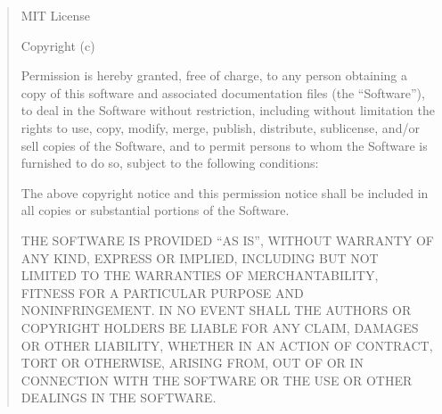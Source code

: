 %

\makeatletter

\expandafter\def\csname qdissertation@licensetext@MIT\endcsname{%
  \begin{quote}\small\raggedright
    MIT License

    Copyright (c) \ifstrempty{\qdissertation@licenseyear}{\number\year}{\qdissertation@licenseyear}\ %
    \ifstrempty{\qdissertation@copyrightholder}{\qdissertation@author}{\qdissertation@copyrightholder}

    Permission is hereby granted, free of charge, to any person obtaining a copy of this software and associated documentation files (the ``Software''), to deal in the Software without restriction, including without limitation the rights to use, copy, modify, merge, publish, distribute, sublicense, and/or sell copies of the Software, and to permit persons to whom the Software is furnished to do so, subject to the following conditions:

    The above copyright notice and this permission notice shall be included in all copies or substantial portions of the Software.

    THE SOFTWARE IS PROVIDED ``AS IS'', WITHOUT WARRANTY OF ANY KIND, EXPRESS OR IMPLIED, INCLUDING BUT NOT LIMITED TO THE WARRANTIES OF MERCHANTABILITY, FITNESS FOR A PARTICULAR PURPOSE AND NONINFRINGEMENT. IN NO EVENT SHALL THE AUTHORS OR COPYRIGHT HOLDERS BE LIABLE FOR ANY CLAIM, DAMAGES OR OTHER LIABILITY, WHETHER IN AN ACTION OF CONTRACT, TORT OR OTHERWISE, ARISING FROM, OUT OF OR IN CONNECTION WITH THE SOFTWARE OR THE USE OR OTHER DEALINGS IN THE SOFTWARE.
  \end{quote}%
}

